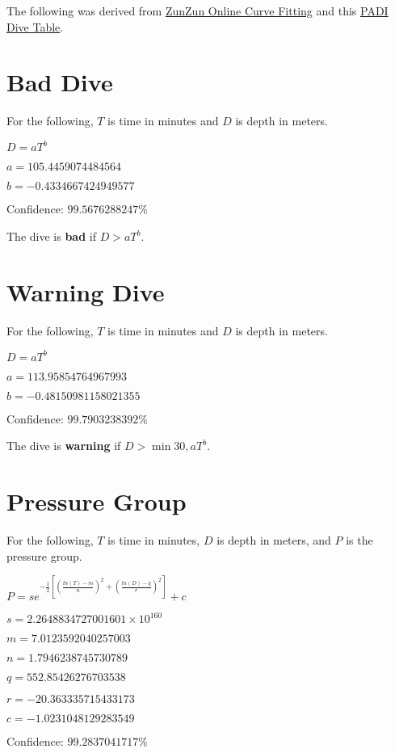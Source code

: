 \documentclass[17pt]{article}
\begin{document}
The following was derived from \href{http://zunzun.com/}{ZunZun Online Curve Fitting} and this \href{http://www.orka.lt/img/planner.jpg}{PADI Dive Table}.

\section{Bad Dive}

For the following, $T$ is time in minutes and $D$ is depth in meters.

$D = aT^b$

$a = 105.4459074484564$

$b = -0.4334667424949577$

Confidence: $99.5676288247\%$

The dive is \textbf{bad} if $D > aT^b$.

\section{Warning Dive}

For the following, $T$ is time in minutes and $D$ is depth in meters.

$D = aT^b$

$a = 113.95854764967993$

$b = -0.48150981158021355$

Confidence: $99.7903238392\%$

The dive is \textbf{warning} if $D > \min 30, aT^b$.

\newpage

\section{Pressure Group}

For the following, $T$ is time in minutes, $D$ is depth in meters, and $P$ is the pressure group.

$P = se^{-\frac{1}{2}\left[\left(\frac{ln(T) - m}{n}\right)^2 + \left(\frac{ln(D) - q}{r}\right)^2\right]} + c$

$s = 2.2648834727001601 \times 10^{160}$

$m = 7.0123592040257003$

$n = 1.7946238745730789$

$q = 552.85426276703538$

$r = -20.363335715433173$

$c = -1.0231048129283549$

Confidence: $99.2837041717\%$
\end{document}

